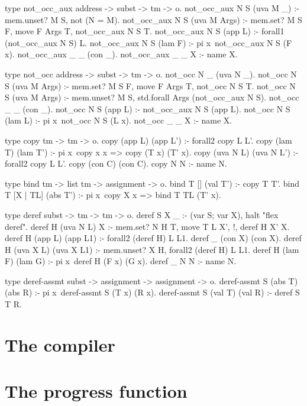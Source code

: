 \begin{elpicode}
  type not_occ_aux address -> subst -> tm -> o.
  not_occ_aux N S (uva M _) :- mem.unset? M S, not (N = M).
  not_occ_aux N S (uva M Args) :- mem.set? M S F, 
    move F Args T, not_occ_aux N S T.
  not_occ_aux N S (app L) :- forall1 (not_occ_aux N S) L.
  not_occ_aux N S (lam F) :- pi x\ not_occ_aux N S (F x).
  not_occ_aux _ _ (con _).
  not_occ_aux _ _ X :- name X.
  
  type not_occ  address -> subst -> tm -> o.
  not_occ N _ (uva N _).
  not_occ N S (uva M Args) :- mem.set? M S F, 
    move F Args T, not_occ N S T.
  not_occ N S (uva M Args) :- mem.unset? M S, 
    std.forall Args (not_occ_aux N S).
  not_occ _ _ (con _).
  not_occ N S (app L) :- not_occ_aux N S (app L).
  not_occ N S (lam L) :- pi x\ not_occ N S (L x).
  not_occ _ _ X :- name X.

  type copy tm -> tm -> o.
  copy (app L)   (app L') :- forall2 copy L L'.
  copy (lam T)   (lam T') :- pi x\ copy x x => copy (T x) (T' x).
  copy (uva N L) (uva N L') :- forall2 copy L L'.
  copy (con C)   (con C).
  copy N N :- name N.

  type bind tm -> list tm -> assignment -> o.
  bind T [] (val T') :- copy T T'.
  bind T [X | TL] (abs T') :- pi x\ copy X x => bind T TL (T' x).

  type deref subst -> tm -> tm -> o.
  deref S X _ :- (var S; var X), halt "flex deref".
  deref H (uva N L)  X         :- mem.set? N H T, 
    move T L X', !, deref H X' X.
  deref H (app L)   (app L1)   :- forall2 (deref H) L L1.
  deref _ (con X)   (con X).
  deref H (uva X L) (uva X L1) :- mem.unset? X H, 
    forall2 (deref H) L L1.
  deref H (lam F)   (lam G)    :- pi x\ deref H (F x) (G x).
  deref _ N         N          :- name N.

  type deref-assmt subst -> assignment -> assignment -> o.
  deref-assmt S (abs T) (abs R) :- pi x\ deref-assmt S (T x) (R x).
  deref-assmt S (val T) (val R) :- deref S T R.
\end{elpicode}
\section{The compiler}



\section{The progress function}

